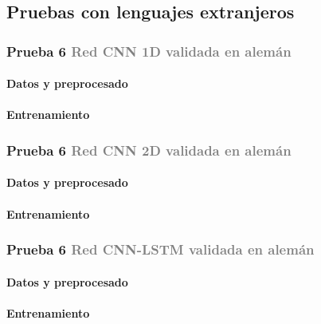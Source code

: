 \documentclass[11pt,a4paper,spanish]{book}
\begin{document}
	\subsection{Pruebas con lenguajes extranjeros}
	
	\subsubsection[]{\large Prueba 6 {\normalsize \textcolor{Gray}{Red CNN 1D validada en alemán}}}
	
	\hfill\begin{minipage}{\dimexpr\textwidth-1cm}
		
		\paragraph{Datos y preprocesado} 
		\paragraph{Entrenamiento}
		
	\end{minipage}

	\subsubsection[]{\large Prueba 6 {\normalsize \textcolor{Gray}{Red CNN 2D validada en alemán}}}
	
	\hfill\begin{minipage}{\dimexpr\textwidth-1cm}
		
		\paragraph{Datos y preprocesado} 
		\paragraph{Entrenamiento}
		
	\end{minipage}

	\subsubsection[]{\large Prueba 6 {\normalsize \textcolor{Gray}{Red CNN-LSTM validada en alemán}}}
	
	\hfill\begin{minipage}{\dimexpr\textwidth-1cm}
		
		\paragraph{Datos y preprocesado} 
		\paragraph{Entrenamiento}
		
	\end{minipage}



	
	
	
	
	

		
		
		

	
	
	
		\printbibliography
	
\end{document}
